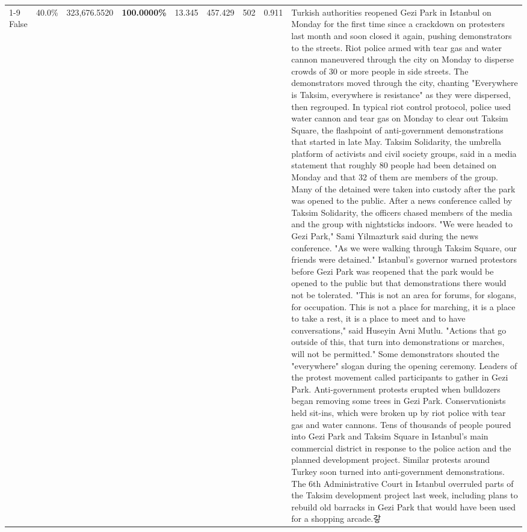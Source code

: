 \begin{table}[H]
\begin{tabular}{lllrlllll}
\cline{1-9}
False & 40.0\% & 323,676.5520 & \bfseries \color{red} 100.0000\% & 13.345 & 457.429 & 502 & 0.911 & Turkish authorities reopened Gezi Park in Istanbul on Monday for the first time since a crackdown on protesters last month and soon closed it again, pushing demonstrators to the streets. Riot police armed with tear gas and water cannon maneuvered through the city on Monday to disperse crowds of 30 or more people in side streets. The demonstrators moved through the city, chanting "Everywhere is Taksim, everywhere is resistance" as they were dispersed, then regrouped. In typical riot control protocol, police used water cannon and tear gas on Monday to clear out Taksim Square, the flashpoint of anti-government demonstrations that started in late May. Taksim Solidarity, the umbrella platform of activists and civil society groups, said in a media statement that roughly 80 people had been detained on Monday and that 32 of them are members of the group. Many of the detained were taken into custody after the park was opened to the public. After a news conference called by Taksim Solidarity, the officers chased members of the media and the group with nightsticks indoors. "We were headed to Gezi Park," Sami Yilmazturk said during the news conference. "As we were walking through Taksim Square, our friends were detained." Istanbul's governor warned protestors before Gezi Park was reopened that the park would be opened to the public but that demonstrations there would not be tolerated. "This is not an area for forums, for slogans, for occupation. This is not a place for marching, it is a place to take a rest, it is a place to meet and to have conversations," said Huseyin Avni Mutlu. "Actions that go outside of this, that turn into demonstrations or marches, will not be permitted." Some demonstrators shouted the "everywhere" slogan during the opening ceremony. Leaders of the protest movement called participants to gather in Gezi Park. Anti-government protests erupted when bulldozers began removing some trees in Gezi Park. Conservationists held sit-ins, which were broken up by riot police with tear gas and water cannons. Tens of thousands of people poured into Gezi Park and Taksim Square in Istanbul's main commercial district in response to the police action and the planned development project. Similar protests around Turkey soon turned into anti-government demonstrations. The 6th Administrative Court in Istanbul overruled parts of the Taksim development project last week, including plans to rebuild old barracks in Gezi Park that would have been used for a shopping arcade.갛 \\

\end{tabular}
\end{table}
